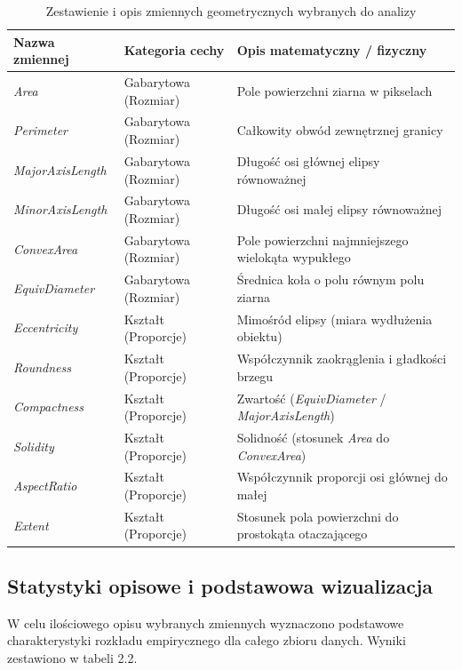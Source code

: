 \documentclass{report}
\begin{document}
\begin{table}[H]
\centering
\caption{Zestawienie i opis zmiennych geometrycznych wybranych do analizy}
\label{tab:zmienne_opis}
\begin{tabular}{lll}
\toprule
\textbf{Nazwa zmiennej} & \textbf{Kategoria cechy} & \textbf{Opis matematyczny / fizyczny} \\
\midrule
\textit{Area} & Gabarytowa (Rozmiar) & Pole powierzchni ziarna w pikselach \\
\textit{Perimeter} & Gabarytowa (Rozmiar) & Całkowity obwód zewnętrznej granicy \\
\textit{MajorAxisLength} & Gabarytowa (Rozmiar) & Długość osi głównej elipsy równoważnej \\
\textit{MinorAxisLength} & Gabarytowa (Rozmiar) & Długość osi małej elipsy równoważnej \\
\textit{ConvexArea} & Gabarytowa (Rozmiar) & Pole powierzchni najmniejszego wielokąta wypukłego \\
\textit{EquivDiameter} & Gabarytowa (Rozmiar) & Średnica koła o polu równym polu ziarna \\
\midrule
\textit{Eccentricity} & Kształt (Proporcje) & Mimośród elipsy (miara wydłużenia obiektu) \\
\textit{Roundness} & Kształt (Proporcje) & Współczynnik zaokrąglenia i gładkości brzegu \\
\textit{Compactness} & Kształt (Proporcje) & Zwartość (\textit{EquivDiameter} / \textit{MajorAxisLength}) \\
\textit{Solidity} & Kształt (Proporcje) & Solidność (stosunek \textit{Area} do \textit{ConvexArea}) \\
\textit{AspectRatio} & Kształt (Proporcje) & Współczynnik proporcji osi głównej do małej \\
\textit{Extent} & Kształt (Proporcje) & Stosunek pola powierzchni do prostokąta otaczającego \\
\bottomrule
\end{tabular}
\end{table}

\subsection{Statystyki opisowe i podstawowa wizualizacja}

W celu ilościowego opisu wybranych zmiennych wyznaczono podstawowe charakterystyki rozkładu empirycznego dla całego zbioru danych. Wyniki zestawiono w tabeli 2.2.
\end{document}

